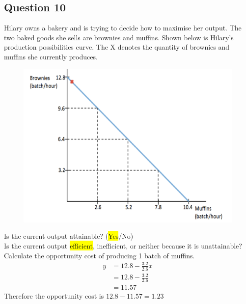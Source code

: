 \subsection{Question 10}
Hilary owns a bakery and is trying to decide how to maximise her output. The two baked goods she sells are brownies and muffins. Shown below is Hilary's production possibilities curve. The X denotes the quantity of brownies and muffins she currently produces.
\begin{figure}[H]
	\centering
	\includegraphics[width=0.6\linewidth]{cml_1_2_10}
\end{figure}
\noindent Is the current output attainable? (\hl{Yes}/No)\\
Is the current output \hl{efficient}, inefficient, or neither because it is unattainable?
Calculate the opportunity cost of producing 1 batch of muffins.
\begin{align*}
	y &= 12.8 - \frac{3.2}{2.6}x\\
	&= 12.8 - \frac{3.2}{2.6}\\
	&= 11.57
\end{align*}
Therefore the opportunity cost is $12.8 - 11.57 = 1.23$